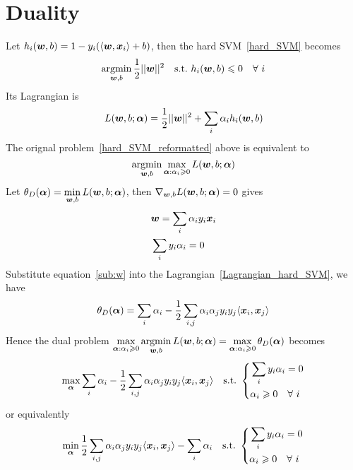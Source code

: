 \section{Duality}

Let $h_i(\boldsymbol{w}, b) = 1 - y_i(\langle \boldsymbol{w}, \boldsymbol{x}_i\rangle + b)$, then the hard SVM~\eqref{hard_SVM} becomes
\begin{equation}\label{hard_SVM_reformatted}
\operatorname*{argmin}_{\boldsymbol{w},b} \frac{1}{2}||\boldsymbol{w}||^2\quad\text{s.t.\ } h_i(\boldsymbol{w}, b) \leqslant 0\quad\forall~i
\end{equation}
Its Lagrangian is
\begin{equation}\label{Lagrangian_hard_SVM}
    L(\boldsymbol{w}, b; \boldsymbol{\alpha}) = \frac{1}{2}||\boldsymbol{w}||^2 + \sum_i \alpha_i h_i(\boldsymbol{w}, b)
\end{equation}
The orignal problem~\eqref{hard_SVM_reformatted} above is equivalent to
$$\operatorname*{argmin}_{\boldsymbol{w}, b}\max_{\boldsymbol{\alpha}: \alpha_i \geqslant 0} L(\boldsymbol{w}, b; \boldsymbol{\alpha})$$
Let $\displaystyle\theta_D(\boldsymbol{\alpha}) = \min_{\boldsymbol{w}, b}L(\boldsymbol{w}, b; \boldsymbol{\alpha})$, then 
$\nabla_{\boldsymbol{w}, b} L(\boldsymbol{w}, b; \boldsymbol{\alpha}) = 0$ gives
\begin{subequations}
    \begin{align}
    &\boldsymbol{w} = \sum_i \alpha_i y_i \boldsymbol{x}_i\label{sub:w}\\
    &\sum_i y_i \alpha_i = 0\label{sub:b}
    \end{align}
\end{subequations}
Substitute equation~\eqref{sub:w} into the Lagrangian~\eqref{Lagrangian_hard_SVM}, we have
\begin{equation}
    \theta_D(\boldsymbol{\alpha}) = \sum_i \alpha_i - \frac{1}{2}\sum_{i, j}\alpha_i\alpha_j y_i y_j\langle \boldsymbol{x}_i, 
    \boldsymbol{x}_j\rangle
\end{equation}
Hence the dual problem $\displaystyle \max_{\boldsymbol{\alpha}: \alpha_i \geqslant 0} \operatorname*{argmin}_{\boldsymbol{w}, b}
L(\boldsymbol{w}, b; \boldsymbol{\alpha}) = \max_{\boldsymbol{\alpha}: \alpha_i \geqslant 0}\theta_D(\boldsymbol{\alpha})$ becomes
\begin{equation*}
    \max_{\boldsymbol{\alpha}}\sum_i \alpha_i - \frac{1}{2}\sum_{i, j}\alpha_i\alpha_j y_i y_j\langle \boldsymbol{x}_i, \boldsymbol{x}_j
    \rangle\quad\text{s.t.\ } \left\{
    \begin{aligned}
    &\sum_i y_i \alpha_i = 0\\
    &\alpha_i \geqslant 0\quad\forall~i
    \end{aligned}\right.
\end{equation*}
or equivalently
\begin{equation}\label{dual_hard_SVM}
    \min_{\boldsymbol{\alpha}}\frac{1}{2}\sum_{i, j}\alpha_i\alpha_j y_i y_j\langle \boldsymbol{x}_i, \boldsymbol{x}_j\rangle -
    \sum_i \alpha_i \quad\text{s.t.\ } \left\{
    \begin{aligned}
        &\sum_i y_i \alpha_i = 0\\
        &\alpha_i \geqslant 0\quad\forall~i
        \end{aligned}\right.
\end{equation}
